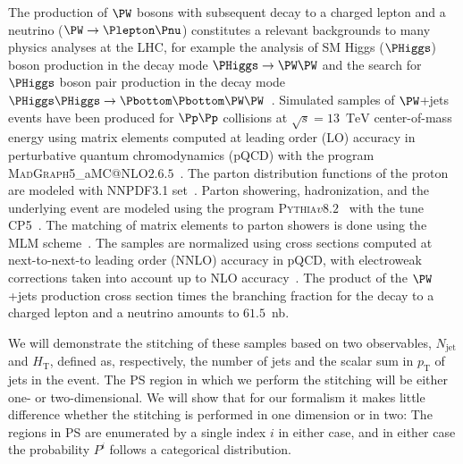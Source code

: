 \documentclass[twocolumn,epjc3]{svjour3}
\makeatletter
\newcommand{\PZggx}{\ensuremath{\PZ/\Pgamma^{*}}\xspace}
\newcommand{\pT}{\ensuremath{p_{\textrm{T}}}\xspace}
\newcommand{\HT}{\ensuremath{H_{\mathrm{T}}}\xspace}
\newcommand{\GeV}{\ensuremath{\textrm{GeV}}\xspace}
\newcommand{\TeV}{\ensuremath{\textrm{TeV}}\xspace}
\newcommand{\jet}{\ensuremath{\textrm{jet}}\xspace}
\newcommand{\MGvATNLO}{\textsc{MadGraph5}\_aMC@NLO\xspace}
\newcommand{\PYTHIA}{\textsc{Pythia}\xspace}
\makeatother
\begin{document}
The 
production of $\PW$ bosons with subsequent decay to a charged lepton and a neutrino ($\PW \to \Plepton\Pnu$)
constitutes a relevant backgrounds to many physics analyses at the LHC,
for example the analysis of SM Higgs ($\PHiggs$) boson production in the decay 
mode $\PHiggs \to \PW\PW$
and the search for $\PHiggs$ boson pair production in the decay 
mode $\PHiggs\PHiggs \to \Pbottom\Pbottom\PW\PW$~\cite{ATLAS:2014aga,Aad:2019yxi,CMS-HIG-13-027,CMS-HIG-17-006}.
Simulated samples of $\PW$+jets 
events have been produced for $\Pp\Pp$ collisions at $\sqrt{s}=13$~\TeV center-of-mass energy
using matrix elements computed at leading order (LO) 
accuracy in perturbative quantum chromodynamics (pQCD)
with the program \MGvATNLO $2.6.5$~\cite{MGvATNLO}.
The parton distribution functions of the proton are modeled with NNPDF3.1 set~\cite{NNPDF:2017mvq}.
Parton showering, hadronization, and the underlying event are modeled using the program \PYTHIA $v8.2$~\cite{PYTHIA} with the tune \textrm{CP5}~\cite{Sirunyan:2019dfx}.
The matching of matrix elements to parton showers is done using the \textrm{MLM} scheme~\cite{Alwall:2007fs}.%
The 
samples are normalized using cross sections computed at next-to-next-to leading order (NNLO) accuracy in pQCD,
with electroweak corrections taken into account up to NLO accuracy~\cite{Li:2012wna}.
The product of the $\PW$+jets production cross section times the branching fraction for the decay to a charged lepton and a neutrino amounts to $61.5$~nb.

We will demonstrate the stitching of these samples based on two observables,
$N_{\jet}$ and $\HT$, defined as, respectively, the number of jets and the scalar sum in $\pT$ of jets in the event.
The PS region in which we perform the stitching will be either one- or two-dimensional.
We will show that for our formalism
it makes little difference whether the stitching is performed in one dimension or in two:
The regions in PS are enumerated by a single index $i$ in either case,
and in either case the probability $P^{i}$ follows a categorical distribution.
\end{document}
